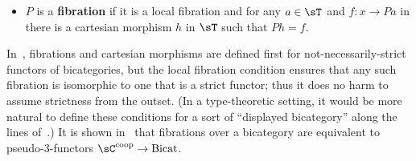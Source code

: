 \documentclass{amsart}
\begin{document}
\begin{defn}
\begin{itemize}
  \item $P$ is a \textbf{fibration} if it is a local fibration and for any $a\in\sT$ and $f:x\to Pa$ in \sC there is a cartesian morphism $h$ in $\sT$ such that $Ph=f$.
  \end{itemize}
\end{defn}

In~\cite{buckley:2fib}, fibrations and cartesian morphisms are defined first for not-necessarily-strict functors of bicategories, but the local fibration condition ensures that any such fibration is isomorphic to one that is a strict functor; thus it does no harm to assume strictness from the outset.
(In a type-theoretic setting, it would be more natural to define these conditions for a sort of ``displayed bicategory'' along the lines of~\cite{al:displayed}.)
It is shown in~\cite[Theorem 3.3.12]{buckley:2fib} that fibrations over a bicategory \sC are equivalent to pseudo-3-functors $\sC\coop\to \mathrm{Bicat}$.

\end{document}
